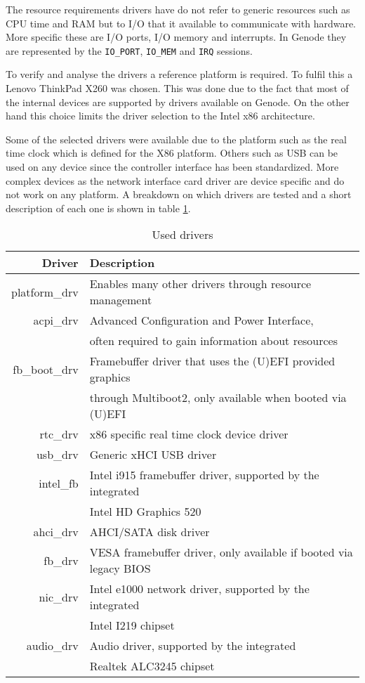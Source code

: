 \documentclass[
a4paper,
12pt,
notitlepage,
parskip=half,
DIV=11,
]{scrbook}
\begin{document}
		The resource requirements drivers have do not refer to generic resources such as CPU time and RAM but to I/O that it available to communicate with hardware.
		More specific these are I/O ports, I/O memory and interrupts.
		In Genode they are represented by the \texttt{IO\_PORT}, \texttt{IO\_MEM} and \texttt{IRQ} sessions.
		
		To verify and analyse the drivers a reference platform is required.
		To fulfil this a Lenovo ThinkPad X260 was chosen.
		This was done due to the fact that most of the internal devices are supported by drivers available on Genode.
		On the other hand this choice limits the driver selection to the Intel x86 architecture.
		
		Some of the selected drivers were available due to the platform such as the real time clock which is defined for the X86 platform.
		Others such as USB can be used on any device since the controller interface has been standardized.
		More complex devices as the network interface card driver are device specific and do not work on any platform.
		A breakdown on which drivers are tested and a short description of each one is shown in table \ref{driver_selection}.
		
		\begin{table}[]
			\centering
			\begin{tabular}{r|l}
				Driver        & 
				Description 
				\\ \hline
				platform\_drv & 
				Enables many other drivers through resource management
				\\ \hline
				acpi\_drv     &
				Advanced Configuration and Power Interface,
				\\& often required to gain information about resources \citep{acpi_spec}
				\\ \hline
				fb\_boot\_drv &
				Framebuffer driver that uses the (U)EFI provided graphics
				\\& through Multiboot2, only available when booted via (U)EFI  \citep{multiboot2}
				\\ \hline
				rtc\_drv      &
				x86 specific real time clock device driver
				\\ \hline
				usb\_drv      &
				Generic xHCI USB driver \citep{xhci}
				\\ \hline
				intel\_fb     &
				Intel i915 framebuffer driver, supported by the integrated
				\\& Intel HD Graphics 520 \citep{x260}
				\\ \hline
				ahci\_drv     &
				AHCI/SATA disk driver
				\\ \hline
				fb\_drv       &
				VESA framebuffer driver, only available if booted via legacy BIOS
				\\ \hline
				nic\_drv      &
				Intel e1000 network driver, supported by the integrated
				\\& Intel I219 chipset \citep{x260}
				\\  \hline
				audio\_drv    &
				Audio driver, supported by the integrated
				\\& Realtek ALC3245 chipset \citep{x260}
			\end{tabular}
			\caption{Used drivers}
			\label{driver_selection}
		\end{table}
		
\end{document}
